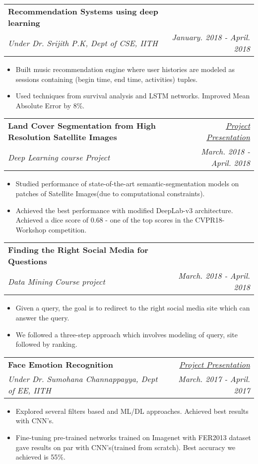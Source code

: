 \documentclass[letterpaper,11pt]{article}
\makeatletter
\newcommand{\resumeSubheading}[4]{
  \vspace{-1pt}\item
    \begin{tabular*}{0.97\textwidth}{l@{\extracolsep{\fill}}r}
      \textbf{#1} & #2 \\
      \textit{\small#3} & \textit{\small #4} \\
    \end{tabular*}\vspace{-5pt}
}
\newcommand{\resumeItemListStart}{\begin{itemize}}
\newcommand{\resumeItemListEnd}{\end{itemize}\vspace{-5pt}}
\makeatother
\begin{document}
      \resumeSubheading
      {Recommendation Systems using deep learning}{}	
      {Under Dr. Srijith P.K, Dept of CSE, IITH}{January. 2018 - April. 2018}
      \resumeItemListStart
      	\itemsep0em
       	\item{Built music recommendation engine where user histories are modeled as sessions containing (begin time, end time, activities) tuples. }
		\item{Used techniques from survival analysis and LSTM networks. Improved Mean Absolute Error by 8\%.}
      \resumeItemListEnd
      
      \resumeSubheading
      {Land Cover Segmentation from High Resolution Satellite Images}{\href{https://drive.google.com/open?id=1X9-JzzfE5uaLExOh8FgHvfzj9-9DsrBF}{{\color{blue}\textit{Project Presentation}}}}
      {Deep Learning course Project}{March. 2018 - April. 2018}
      \resumeItemListStart
      	\itemsep0em
       	\item{Studied performance of state-of-the-art semantic-segmentation models on patches of Satellite Images(due to computational constraints). 
}
		\item{Achieved the best performance with modified DeepLab-v3 architecture. Achieved a dice score of 0.68 - one of the top scores in the CVPR18-Workshop competition.}
      \resumeItemListEnd     
     
      \resumeSubheading
      {Finding the Right Social Media for Questions}{ \href{https://drive.google.com/open?id=1R13GQEIdIHoSOHFMXU-5oLd_m17u8dMc}{\color{blue}{\textit{Project Presentation}} }}
      {Data Mining Course project}{March. 2018 - April. 2018}
      \resumeItemListStart
      	\itemsep0em
       	\item{Given a query, the goal is to redirect to the right social media site which can answer the query. }
       	\item{We followed a three-step approach which involves modeling of query, site followed by ranking.}
      \resumeItemListEnd
     
      \resumeSubheading
      {Face Emotion Recognition}{\href{https://docs.google.com/presentation/d/1gFxSQZRY7D6Aw9Jioxa-PuaQJlLhG-lilpanNdkTyVI/edit?usp=sharing}{{\color{blue}\textit{Project Presentation}}}}
      {Under Dr. Sumohana Channappayya, Dept of EE, IITH}{March. 2017 - April. 2017}
      \resumeItemListStart
      	\itemsep0em
       	\item{Explored several filters based and ML/DL approaches. Achieved best results with CNN’s. }
       	\item{Fine-tuning pre-trained networks trained on Imagenet with FER2013 dataset gave results on par with CNN's(trained from scratch). Best accuracy we achieved is 55\%.}
      \resumeItemListEnd
      
\end{document}
